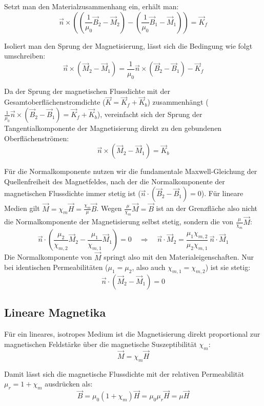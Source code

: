 \documentclass[11pt]{article}
\begin{document}
Setzt man den Materialzusammenhang ein, erhält man:
\begin{equation}
    \vec{n} \times \left( \left(\frac{1}{\mu_0} \vec{B}_2 - \vec{M}_2\right) - \left(\frac{1}{\mu_0} \vec{B}_1 - \vec{M}_1\right) \right) = \vec{K}_f
\end{equation}

Isoliert man den Sprung der Magnetisierung, lässt sich die Bedingung wie folgt umschreiben:
\begin{equation}
    \vec{n} \times (\vec{M}_2 - \vec{M}_1) = \frac{1}{\mu_0} \vec{n} \times (\vec{B}_2 - \vec{B}_1) - \vec{K}_f
\end{equation}

Da der Sprung der magnetischen Flussdichte mit der Gesamtoberflächenstromdichte ($\vec{K} = \vec{K}_f + \vec{K}_b$) zusammenhängt ($\frac{1}{\mu_0} \vec{n} \times (\vec{B}_2 - \vec{B}_1) = \vec{K}_f + \vec{K}_b$), vereinfacht sich der Sprung der Tangentialkomponente der Magnetisierung direkt zu den gebundenen Oberflächenströmen:
\begin{equation}
    \vec{n} \times (\vec{M}_2 - \vec{M}_1) = \vec{K}_b
\end{equation}

Für die Normalkomponente nutzen wir die fundamentale Maxwell-Gleichung der Quellenfreiheit des Magnetfeldes, nach der die Normalkomponente der magnetischen Flussdichte immer stetig ist ($\vec{n} \cdot (\vec{B}_2 - \vec{B}_1) = 0$). Für lineare Medien gilt $\vec{M} = \chi_m \vec{H} = \frac{\chi_m}{\mu} \vec{B}$. Wegen $\frac{\mu}{\chi_m} \vec{M} = \vec{B}$ ist an der Grenzfläche also nicht die Normalkomponente der Magnetisierung selbst stetig, sondern die von $\frac{\mu}{\chi_m} \vec{M}$:
\begin{equation}
    \vec{n} \cdot \left( \frac{\mu_2}{\chi_{m,2}} \vec{M}_2 - \frac{\mu_1}{\chi_{m,1}} \vec{M}_1 \right) = 0
    \quad \Rightarrow \quad
    \vec{n} \cdot \vec{M}_2 = \frac{\mu_1 \chi_{m,2}}{\mu_2 \chi_{m,1}} \, \vec{n} \cdot \vec{M}_1
\end{equation}
Die Normalkomponente von $\vec{M}$ springt also mit den Materialeigenschaften. Nur bei identischen Permeabilitäten ($\mu_1 = \mu_2$, also auch $\chi_{m,1} = \chi_{m,2}$) ist sie stetig:
\begin{equation}
    \vec{n} \cdot (\vec{M}_2 - \vec{M}_1) = 0
\end{equation}

\subsection{Lineare Magnetika}
Für ein lineares, isotropes Medium ist die Magnetisierung direkt proportional zur magnetischen Feldstärke über die magnetische Suszeptibilität $\chi_m$:
\begin{equation}
    \vec{M} = \chi_m \vec{H}
\end{equation}

Damit lässt sich die magnetische Flussdichte mit der relativen Permeabilität $\mu_r = 1 + \chi_m$ ausdrücken als:
\begin{equation}
    \vec{B} = \mu_0 (1 + \chi_m) \vec{H} = \mu_0 \mu_r \vec{H} = \mu \vec{H}
\end{equation}
\end{document}
